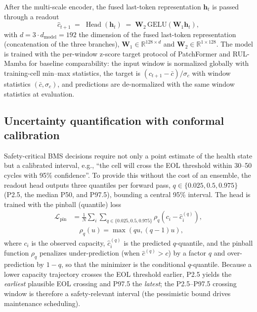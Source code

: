 After the multi-scale encoder, the fused last-token representation
$\mathbf{h}_{t}$ is passed through a readout
\begin{equation}
\label{eq:head}
\hat{c}_{t+1}
\;=\; \operatorname{Head}(\mathbf{h}_t)
\;=\; \mathbf{W}_2\, \mathrm{GELU}(\mathbf{W}_1 \mathbf{h}_t),
\end{equation}
with $d = 3 \cdot d_{\text{model}} = 192$ the dimension of the fused
last-token representation (concatenation of the three branches),
$\mathbf{W}_1 \in \mathbb{R}^{128 \times d}$ and
$\mathbf{W}_2 \in \mathbb{R}^{1 \times 128}$. The model is trained
with the per-window z-score target protocol of PatchFormer and
RUL-Mamba for baseline comparability: the input window is normalized
globally with training-cell min--max statistics, the target is
$(c_{t+1} - \bar{c})/\sigma_c$ with window statistics
$(\bar{c}, \sigma_c)$, and predictions are de-normalized with the
same window statistics at evaluation.

\subsection{Uncertainty quantification with conformal calibration}
\label{sec:quantile}

Safety-critical BMS decisions require not only a point estimate of
the health state but a calibrated interval, e.g., ``the cell will
cross the EOL threshold within 30--50 cycles with 95\% confidence''.
To provide this without the cost of an ensemble, the readout head
outputs three quantiles per forward pass,
$q \in \{0.025, 0.5, 0.975\}$ (P2.5, the median P50, and P97.5),
bounding a central 95\% interval. The head is trained
with the pinball (quantile) loss
\begin{equation}
\begin{split}
\mathcal{L}_{\text{pin}} &=
\frac{1}{N}\sum_{i}\sum_{q \in \{0.025,0.5,0.975\}}
\rho_q\!\left( c_i - \hat{c}_i^{(q)} \right), \\
&\quad \rho_q(u) = \max(q u, (q-1) u),
\end{split}
\end{equation}
where $c_i$ is the observed capacity, $\hat{c}_i^{(q)}$ is the
predicted $q$-quantile, and the pinball function $\rho_q$ penalizes
under-prediction (when $\hat{c}^{(q)} > c$) by a factor $q$ and
over-prediction by $1-q$, so that the minimizer is the conditional
$q$-quantile. Because a lower capacity trajectory crosses the EOL
threshold earlier, P2.5 yields the \emph{earliest} plausible EOL
crossing and P97.5 the \emph{latest}; the P2.5--P97.5 crossing
window is therefore a safety-relevant interval (the pessimistic
bound drives maintenance scheduling).

